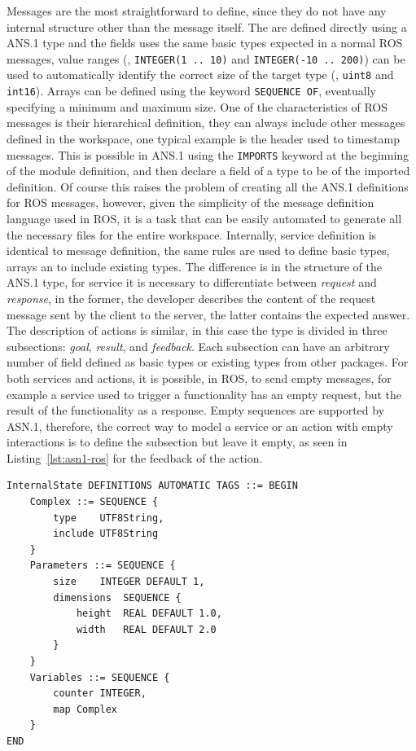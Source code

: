 Messages are the most straightforward to define, since they do not have any internal structure other than the message itself. The are defined directly using a ANS.1 type and the fields uses the same basic types expected in a normal ROS messages, value ranges (\eg, \texttt{INTEGER(1 .. 10)} and \texttt{INTEGER(-10 .. 200)}) can be used to automatically identify the correct size of the target type (\eg, \texttt{uint8} and \texttt{int16}). Arrays can be defined using the keyword \texttt{SEQUENCE OF}, eventually specifying a minimum and maximum size. One of the characteristics of ROS messages is their hierarchical definition, they can always include other messages defined in the workspace, one typical example is the header used to timestamp messages. This is possible in ANS.1 using the \texttt{IMPORTS} keyword at the beginning of the module definition, and then declare a field of a type to be of the imported definition. Of course this raises the problem of creating all the ANS.1 definitions for ROS messages, however, given the simplicity of the message definition language used in ROS, it is a task that can be easily automated to generate all the necessary files for the entire workspace. Internally, service definition is identical to message definition, the same rules are used to define basic types, arrays an to include existing types. The difference is in the structure of the ANS.1 type, for service it is necessary to differentiate between \textit{request} and \textit{response}, in the former, the developer describes the content of the request message sent by the client to the server, the latter contains the expected answer. The description of actions is similar, in this case the type is divided in three subsections: \textit{goal}, \textit{result}, and \textit{feedback}. Each subsection can have an arbitrary number of field defined as basic types or existing types from other packages. For both services and actions, it is possible, in ROS, to send empty messages, for example a service used to trigger a functionality has an empty request, but the result of the functionality as a response. Empty sequences are supported by ASN.1, therefore, the correct way to model a service or an action with empty interactions is to define the subsection but leave it empty, as seen in Listing~\ref{lst:asn1-ros} for the feedback of the action.

\begin{lstlisting}[float,frame=tb,caption={Internal state of a node modelled using ASN.1},label=lst:asn1-ros-is]
InternalState DEFINITIONS AUTOMATIC TAGS ::= BEGIN
	Complex ::= SEQUENCE {
		type	UTF8String,
		include	UTF8String
	}
	Parameters ::= SEQUENCE {
		size	INTEGER DEFAULT 1,
		dimensions	SEQUENCE {
			height	REAL DEFAULT 1.0,
			width	REAL DEFAULT 2.0
		}
	}
	Variables ::= SEQUENCE {
		counter	INTEGER,
		map	Complex
	}
END
\end{lstlisting}

